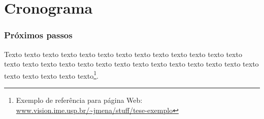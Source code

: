 \chapter{Cronograma}
\label{cap:cronograma}

\subsection{Próximos passos}

Texto texto texto texto texto texto texto texto texto texto texto texto texto
texto texto texto texto texto texto texto texto texto texto texto texto texto
texto texto texto texto texto texto\footnote{Exemplo de referência para página
Web: \url{www.vision.ime.usp.br/~jmena/stuff/tese-exemplo}}.

